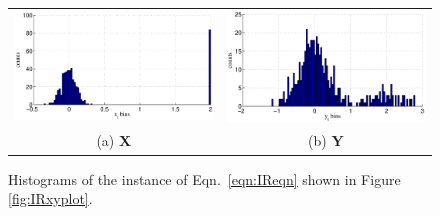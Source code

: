 \begin{figure}[ht]
\begin{tabular}{cc}
\includegraphics[scale=0.5]{NoisyResponseExample_Xhist.eps} & \includegraphics[scale=0.5]{NoisyResponseExample_Yhist.eps} \\
(a) $\mathbf{X}$ & (b) $\mathbf{Y}$
\end{tabular}
\caption{Histograms of the instance of Eqn.\ \ref{eqn:IReqn} shown in Figure \ref{fig:IRxyplot}.}
\label{fig:IRxyhist}
\end{figure}

